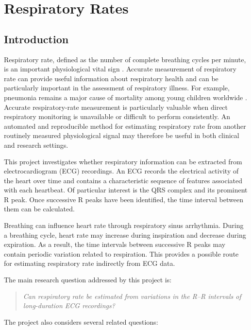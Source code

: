 \chapter{Respiratory Rates}
\label{ch:respiratory-rates}

\section{Introduction}
\label{sec:introduction}

Respiratory rate, defined as the number of complete breathing cycles per
minute, is an important physiological vital sign
\cite{ala2025}. Accurate measurement of respiratory rate can provide useful
information about respiratory health and can be particularly important in
the assessment of respiratory illness. For example, pneumonia remains a
major cause of mortality among young children worldwide
\cite{who2022}. Accurate respiratory-rate measurement
is particularly valuable when direct respiratory monitoring is unavailable or
difficult to perform consistently. An automated and reproducible method for
estimating respiratory rate from another routinely measured physiological
signal may therefore be useful in both clinical and research settings.

This project investigates whether respiratory information can be extracted
from electrocardiogram (ECG) recordings. An ECG records the electrical
activity of the heart over time and contains a characteristic sequence of
features associated with each heartbeat. Of particular interest is the QRS
complex and its prominent R peak. Once successive R peaks have been
identified, the time interval between them can be calculated.

Breathing can influence heart rate through respiratory sinus arrhythmia.
During a breathing cycle, heart rate may increase during inspiration and
decrease during expiration. As a result, the time intervals between
successive R peaks may contain periodic variation related to respiration.
This provides a possible route for estimating respiratory rate indirectly
from ECG data.

The main research question addressed by this project is:

\begin{quote}
\textit{Can respiratory rate be estimated from variations in the R--R
intervals of long-duration ECG recordings?}
\end{quote}

The project also considers several related questions:

